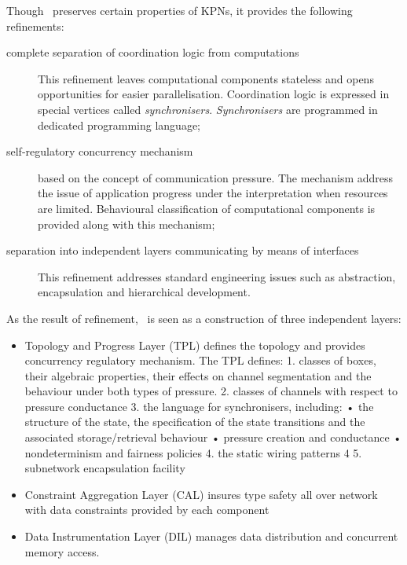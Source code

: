 Though \ak\ preserves certain properties of KPNs, it provides the following refinements:
\begin{description}
\item[complete separation of coordination logic from computations]

This refinement leaves computational components stateless and opens opportunities for easier parallelisation. Coordination logic is expressed in special vertices called \emph{synchronisers}. \emph{Synchronisers} are programmed in dedicated programming language;
\item[self-regulatory concurrency mechanism] based on the concept of communication pressure. The mechanism address the issue of application progress under the interpretation when resources are limited. Behavioural classification of computational components is provided along with this mechanism;
\item[separation into independent layers communicating by means of interfaces]

This refinement addresses standard engineering issues such as abstraction, encapsulation and hierarchical development.
\end{description}

As the result of refinement, \ak\ is seen as a construction of three independent layers:
\begin{itemize}
\item Topology and Progress Layer (TPL) defines the topology and provides concurrency regulatory mechanism.
The TPL defines:
1. classes of boxes, their algebraic properties, their effects on channel segmentation and the behaviour under both types of pressure.
2. classes of channels with respect to pressure conductance 3. the language for synchronisers, including:
• the structure of the state, the specification of the state transitions and the associated storage/retrieval behaviour
• pressure creation and conductance • nondeterminism and fairness policies
4. the static wiring patterns 4
5. subnetwork encapsulation facility

\item Constraint Aggregation Layer (CAL) insures type safety all over network with data constraints provided by each component

\item Data Instrumentation Layer (DIL) manages data distribution and concurrent memory access.
\end{itemize}



